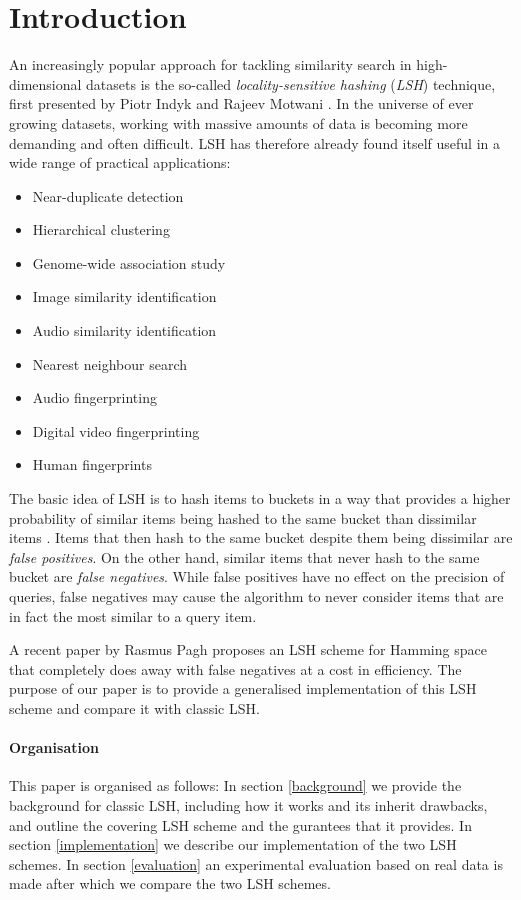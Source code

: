 \section{Introduction}
\label{introduction}

An increasingly popular approach for tackling similarity search in high-dimensional datasets is the so-called \textit{locality-sensitive hashing} (\textit{LSH}) technique, first presented by Piotr Indyk and Rajeev Motwani \cite{DBLP:conf/stoc/IndykM98}. In the universe of ever growing datasets, working with massive amounts of data is becoming more demanding and often difficult. LSH has therefore already found itself useful in a wide range of practical applications:

\begin{itemize}
  \item Near-duplicate detection
  \item Hierarchical clustering
  \item Genome-wide association study
  \item Image similarity identification
  \item Audio similarity identification
  \item Nearest neighbour search
  \item Audio fingerprinting
  \item Digital video fingerprinting
  \item Human fingerprints
\end{itemize}

The basic idea of LSH is to hash items to buckets in a way that provides a higher probability of similar items being hashed to the same bucket than dissimilar items \cite{DBLP:books/cu/LeskovecRU14}. Items that then hash to the same bucket despite them being dissimilar are \textit{false positives}. On the other hand, similar items that never hash to the same bucket are \textit{false negatives}. While false positives have no effect on the precision of queries, false negatives may cause the algorithm to never consider items that are in fact the most similar to a query item.

A recent paper by Rasmus Pagh \cite{DBLP:journals/corr/Pagh15} proposes an LSH scheme for Hamming space that completely does away with false negatives at a cost in efficiency. The purpose of our paper is to provide a generalised implementation of this LSH scheme and compare it with classic LSH.

\paragraph{Organisation} This paper is organised as follows: In section \ref{background} we provide the background for classic LSH, including how it works and its inherit drawbacks, and outline the covering LSH scheme and the gurantees that it provides. In section \ref{implementation} we describe our implementation of the two LSH schemes. In section \ref{evaluation} an experimental evaluation based on real data is made after which we compare the two LSH schemes.
